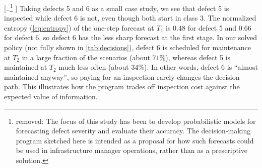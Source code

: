 \documentclass{article}
\providecommand{\DIFadd}[1]{{\protect\color{blue} \sf #1}} %
\providecommand{\DIFdel}[1]{{\protect\color{red} [..\footnote{removed: #1} ]}} %
\providecommand{\DIFaddbegin}{} %
\providecommand{\DIFaddend}{} %
\providecommand{\DIFdelbegin}{} %
\providecommand{\DIFdelend}{} %
\begin{document}
\DIFdelbegin \DIFdel{The focus of this study has been to develop probabilistic models for forecasting defect severity and evaluate their accuracy. The decision-making program sketched here is intended as a proposal for how such forecasts could be used in infrastructure manager operations, rather than as a prescriptive solution. }\DIFdelend \DIFaddbegin \DIFadd{Taking defects 5 and 6 as a small case study, we see that defect 5 is inspected while defect 6 is not, even though both start in class $3$. The normalized entropy (\cref{eq:entropy}) of the one-step forecast at $T_1$ is $0.48$ for defect 5 and $0.66$ for defect 6, so defect 6 has the less sharp forecast at the first stage. %
In our solved policy (not fully shown in \cref{tab:decisions}), defect 6 is scheduled for maintenance at $T_2$ in a large fraction of the scenarios (about $71\%$), whereas defect 5 is maintained at $T_2$ much less often (about $34\%$). In other words, defect 6 is ``almost maintained anyway'', so paying for an inspection rarely changes the decision path. This illustrates how the program trades off inspection cost against the expected value of information.
}\DIFaddend 
\end{document}
